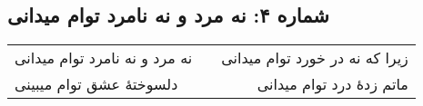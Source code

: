 \begin{center}
\section*{شماره ۴: نه مرد و نه نامرد توام میدانی}
\label{sec:004}
\begin{longtable}{l p{0.5cm} r}
نه مرد و نه نامرد توام میدانی
&&
زیرا که نه در خورد توام میدانی
\\
دلسوختهٔ عشق توام میبینی
&&
ماتم زدهٔ درد توام میدانی
\\
\end{longtable}
\end{center}
